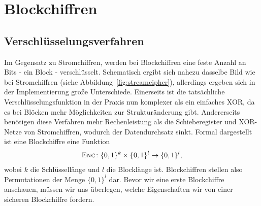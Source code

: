 \section{Blockchiffren}
\label{block}

%

\subsection{Verschlüsselungsverfahren}
Im Gegensatz zu Stromchiffren, werden bei Blockchiffren eine feste Anzahl an Bits - ein Block - verschlüsselt. Schematisch ergibt sich nahezu dasselbe Bild wie bei Stromchiffren (siehe Abbildung~\ref{fig:streamcipher}), allerdings ergeben sich in der Implementierung große Unterschiede. Einerseits ist die tatsächliche Verschlüsselungsfunktion in der Praxis nun komplexer als ein einfaches XOR, da es bei Blöcken mehr Möglichkeiten zur Strukturänderung gibt. Andererseits benötigen diese Verfahren mehr Rechenleistung als die Schieberegister und XOR-Netze von Stromchiffren, wodurch der Datendurchsatz sinkt.
Formal dargestellt ist eine Blockchiffre eine Funktion
\begin{align*}
	\textsc{Enc} \colon \{0, 1\}^k \times \{0, 1\}^l \rightarrow \{0, 1\}^l,
\end{align*}
wobei \(k\) die Schlüssellänge und \(l\) die Blocklänge ist. Blockchiffren stellen also Permutationen der Menge 
\(\{0, 1\}^l\) dar.
Bevor wir eine erste Blockchiffre anschauen, müssen wir uns überlegen, welche Eigenschaften wir von einer sicheren Blockchiffre fordern.

